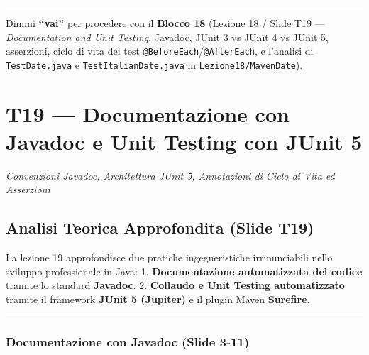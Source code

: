\documentclass[11pt,a4paper,oneside]{report}
\newcommand{\passthrough}[1]{#1}
\begin{document}
\begin{center}\rule{0.5\linewidth}{0.5pt}\end{center}

Dimmi \textbf{``vai''} per procedere con il \textbf{Blocco 18} (Lezione
18 / Slide T19 --- \emph{Documentation and Unit Testing}, Javadoc, JUnit
3 vs JUnit 4 vs JUnit 5, asserzioni, ciclo di vita dei test
\passthrough{\lstinline!@BeforeEach!}/\passthrough{\lstinline!@AfterEach!},
e l'analisi di \passthrough{\lstinline!TestDate.java!} e
\passthrough{\lstinline!TestItalianDate.java!} in
\passthrough{\lstinline!Lezione18/MavenDate!}).

\newpage
\chapter[T19 --- Documentazione con Javadoc e Unit T]{T19 --- Documentazione con Javadoc e Unit Testing con JUnit 5}
\label{chap:t19}

{\small\sffamily\color{accentblue!80!black}\textit{Convenzioni Javadoc, Architettura JUnit 5, Annotazioni di Ciclo di Vita ed Asserzioni}}

\vspace{0.8em}

\section{Analisi Teorica Approfondita (Slide
T19)}\label{chap18_analisi-teorica-approfondita-slide-t19}

La lezione 19 approfondisce due pratiche ingegneristiche irrinunciabili
nello sviluppo professionale in Java: 1. \textbf{Documentazione
automatizzata del codice} tramite lo standard \textbf{Javadoc}. 2.
\textbf{Collaudo e Unit Testing automatizzato} tramite il framework
\textbf{JUnit 5 (Jupiter)} e il plugin Maven \textbf{Surefire}.

\begin{center}\rule{0.5\linewidth}{0.5pt}\end{center}

\subsection{Documentazione con Javadoc (Slide
3-11)}\label{chap18_documentazione-con-javadoc-slide-3-11}
\end{document}

